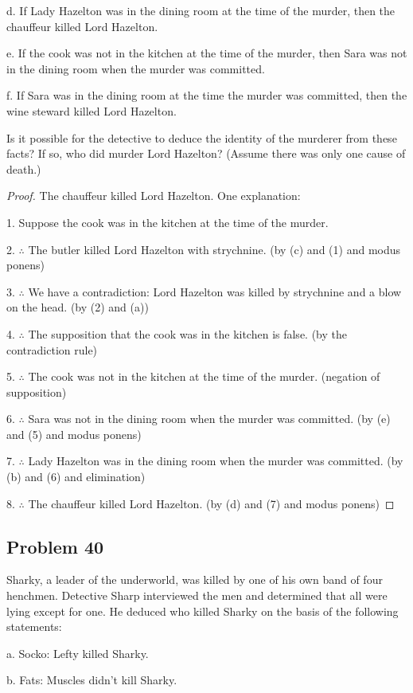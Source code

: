 \documentclass[14pt]{extarticle}
\begin{document}
d. If Lady Hazelton was in the dining room at the time of the murder, then the
chauffeur killed Lord Hazelton.

e. If the cook was not in the kitchen at the time of the murder, then Sara was
not in the dining room when the murder was committed.

f. If Sara was in the dining room at the time the murder was committed, then the
wine steward killed Lord Hazelton.

Is it possible for the detective to deduce the identity of the murderer from
these facts? If so, who did murder Lord Hazelton? (Assume there was only one
cause of death.)

\begin{proof}
The chauffeur killed Lord Hazelton. One explanation:

1. Suppose the cook was in the kitchen at the time of the murder.

2. $\therefore$ The butler killed Lord Hazelton with strychnine.
(by (c) and (1) and modus ponens)

3. $\therefore$ We have a contradiction: Lord Hazelton was
killed by strychnine and a blow on the head. (by (2) and (a))

4. $\therefore$ The supposition that the cook was in the kitchen
is false. (by the contradiction rule)

5. $\therefore$ The cook was not in the kitchen at the time of the murder.
(negation of supposition)

6. $\therefore$ Sara was not in the dining room when the murder
was committed. (by (e) and (5) and modus ponens)

7. $\therefore$ Lady Hazelton was in the dining room when the murder was
committed. (by (b) and (6) and elimination)

8. $\therefore$ The chauffeur killed Lord Hazelton. (by (d) and
(7) and modus ponens)
\end{proof}

\subsection{Problem 40}
Sharky, a leader of the underworld, was killed by one of his own band of four
henchmen. Detective Sharp interviewed the men and determined that all were lying
except for one. He deduced who killed Sharky on the basis of the following
statements:

a. Socko: Lefty killed Sharky.

b. Fats: Muscles didn’t kill Sharky.
\end{document}
